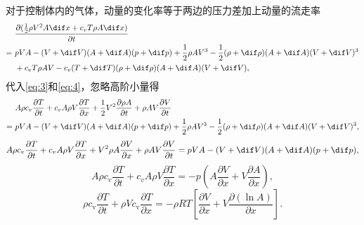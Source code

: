 \documentclass[12pt]{article}
\begin{document}
对于控制体内的气体，动量的变化率等于两边的压力差加上动量的流走率
\begin{align}
	&\frac{\partial (\frac{1}{2} \rho V^2 A \dif x + c_v T \rho A \dif x)}{\partial t} \\
	= \ & p V A  - (V + \dif V)(A+\dif A)(p+\dif p) + \frac{1}{2} \rho A V^3 - \frac{1}{2} (\rho + \dif \rho)(A+\dif A)(V+\dif V)^3 \\
	&+ c_v T\rho AV - c_v (T+\dif T)(\rho+\dif \rho)(A+\dif A)(V+\dif V),
\end{align}
代入\cref{eq:3}和\cref{eq:4}，忽略高阶小量得
\begin{align}
	&  A\rho c_v \frac{\partial T}{\partial t} + c_v A\rho V \frac{\partial T}{\partial x} + \frac{1}{2}V^2 \frac{\partial \rho A}{\partial t} + \rho A V \frac{\partial V}{\partial t} \\
	= \ & p V A  - (V + \dif V)(A+\dif A)(p+\dif p) + \frac{1}{2} \rho A V^3 - \frac{1}{2} (\rho + \dif \rho)(A+\dif A)(V+\dif V)^3 ,
\end{align}
\begin{equation}
	A\rho c_v \frac{\partial T}{\partial t} + c_v A\rho V \frac{\partial T}{\partial x} + V^2 \rho A \frac{\partial V}{\partial x} + \rho A V \frac{\partial V}{\partial t} = p V A  - (V + \dif V)(A+\dif A)(p+\dif p),	
\end{equation}
\begin{equation}
	A\rho c_v \frac{\partial T}{\partial t} + c_v A\rho V \frac{\partial T}{\partial x}= - p \left(A\frac{\partial V}{\partial x} + V \frac{\partial A}{\partial x} \right) ,	
\end{equation}
\begin{equation}
	\rho c_{\mathrm{v}} \frac{\partial T}{\partial t}+\rho V c_{\mathrm{v}} \frac{\partial T}{\partial x}=-\rho R T\left[\frac{\partial V}{\partial x}+V \frac{\partial(\ln A)}{\partial x}\right].
\end{equation}
















\end{document}
